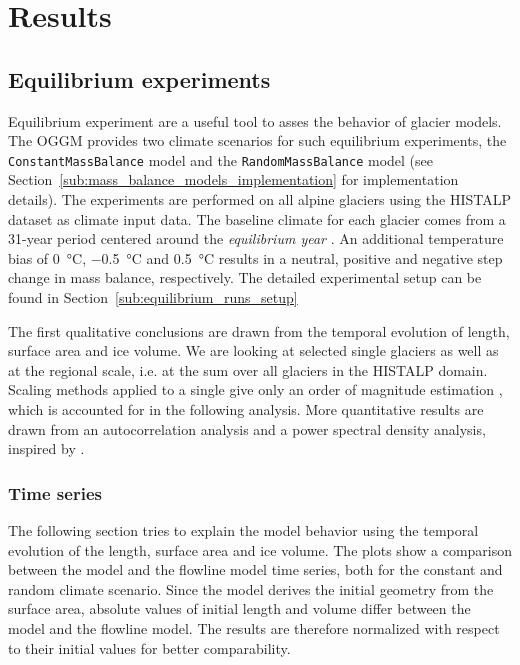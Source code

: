 \chapter{Results}\label{chap:results}
\thispagestyle{plain}

\section{Equilibrium experiments} %
\label{sec:equilibrium_experiments_results}
    Equilibrium experiment are a useful tool to asses the behavior of glacier models. The OGGM provides two climate scenarios for such equilibrium experiments, the \lstinline`ConstantMassBalance` model and the \lstinline`RandomMassBalance` model (see Section~\ref{sub:mass_balance_models_implementation} for implementation details). The experiments are performed on all alpine glaciers using the HISTALP dataset \citep{Auer2007} as climate input data. The baseline climate for each glacier comes from a 31-year period centered around the \textit{equilibrium year} \tstar. An additional temperature bias of \SI{0}{\celsius}, \SI{-0.5}{\celsius} and \SI{+0.5}{\celsius} results in a neutral, positive and negative step change in mass balance, respectively. The detailed experimental setup can be found in Section~\ref{sub:equilibrium_runs_setup}

    The first qualitative conclusions are drawn from the temporal evolution of length, surface area and ice volume. We are looking at selected single glaciers as well as at the regional scale, i.e. at the sum over all glaciers in the HISTALP domain. Scaling methods applied to a single give only an order of magnitude estimation \citep[section 8.5][cf.]{Bahr2015}, which is accounted for in the following analysis. More quantitative results are drawn from an autocorrelation analysis and a power spectral density analysis, inspired by \citet{Roe2014}. %
    
    \subsection{Time series} %
    \label{sub:time_series_results}

      The following section tries to explain the model behavior using the temporal evolution of the length, surface area and ice volume. The plots show a comparison between the \vas{} model and the flowline model time series, both for the constant and random climate scenario. Since the \vas{} model derives the initial geometry from the surface area, absolute values of initial length and volume differ between the \vas{} model and the flowline model. The results are therefore normalized with respect to their initial values for better comparability. %

